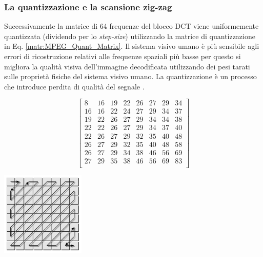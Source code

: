 \subsubsection{La quantizzazione e la scansione zig-zag}
Successivamente la matrice di 64 frequenze del blocco DCT viene uniformemente quantizzata (dividendo per lo \textit{step-size}) utilizzando la matrice di quantizzazione in Eq. \ref{matr:MPEG_Quant_Matrix}. Il sistema visivo umano è più sensibile agli errori di ricostruzione relativi alle frequenze spaziali più basse per questo si migliora la qualità visiva dell'immagine decodificata utilizzando dei pesi tarati sulle proprietà fisiche del sistema visivo umano. La quantizzazione è un processo che introduce perdita di qualità del segnale \parencite{ProgettazioneEproduzioneMultimediale}.

\begin{minipage}{0.5\linewidth}
	\begin{equation} \label{matr:MPEG_Quant_Matrix}
		\begin{bmatrix} 
			8 & 16 & 19 & 22 & 26 & 27 & 29 & 34\\
			16 & 16 & 22 & 24 & 27 & 29 & 34 & 37\\
			19 & 22 & 26 & 27 & 29 & 34 & 34 & 38\\
			22 & 22 & 26 & 27 & 29 & 34 & 37 & 40\\
			22 & 26 & 27 & 29 & 32 & 35 & 40 & 48\\
			26 & 27 & 29 & 32 & 35 & 40 & 48 & 58\\
			26 & 27 & 29 & 34 & 38 & 46 & 56 & 69\\
			27 & 29 & 35 & 38 & 46 & 56 & 69 & 83\\
		\end{bmatrix}
	\end{equation}
	\vfill
\end{minipage}%
\begin{minipage}{0.5\linewidth}
	\centering
	\includegraphics[width=4cm]{immagini/JPEG_ZigZag}
	\label{fig:JPEG_ZigZag}
\end{minipage}%

